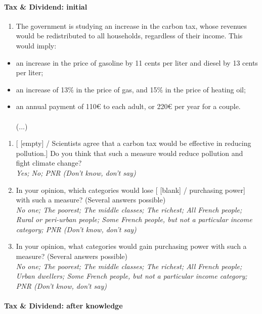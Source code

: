 \documentclass[english,5p,authoryear]{elsarticle}
\begin{document}
\begin{appendices}
\paragraph{Tax \& Dividend: initial}
\begin{enumerate}[resume,leftmargin=*]
\item The government is studying an increase in the carbon tax, whose revenues
would be redistributed to all households, regardless of their income.
This would imply: 
\end{enumerate}
\begin{itemize}
\item an increase in the price of gasoline by 11 cents per liter and diesel
by 13 cents per liter; 
\item an increase of 13\% in the price of gas, and 15\% in the price of
heating oil;
\item an annual payment of 110\euro{} to each adult, or 220\euro{} per year for a couple.
\\
\\
(...)
\end{itemize}
\begin{enumerate}[resume,leftmargin=*]
\item {[} {[}empty{]} / Scientists agree that a carbon tax would be effective
in reducing pollution.{]} Do you think that such a measure would reduce
pollution and fight climate change? \emph{}\\
\emph{Yes; No; PNR (Don't know, don't say)}
\item In your opinion, which categories would lose {[} {[}blank{]} / purchasing
power{]} with such a measure? (Several answers possible) \emph{}\\
\emph{No one; The poorest; The middle classes; The richest; All French
people; Rural or peri-urban people; Some French people, but not a
particular income category; PNR (Don't know, don't say)} 
\item In your opinion, what categories would gain purchasing power with
such a measure? (Several answers possible) \emph{}\\
\emph{No one; The poorest; The middle classes; The richest; All French
people; Urban dwellers; Some French people, but not a particular income
category; PNR (Don't know, don't say)} 
\end{enumerate}

\paragraph{Tax \& Dividend: after knowledge}


\end{appendices}
\end{document}
